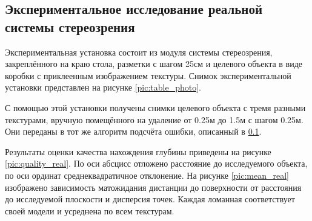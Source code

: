 \subsection{Экспериментальное исследование реальной системы стереозрения}

Экспериментальная установка состоит из модуля системы стереозрения, закреплённого на краю стола, 
разметки с шагом 25см и целевого объекта в виде коробки с приклеенным изображением текстуры. Снимок 
экспериментальной установки представлен на рисунке \ref{pic:table_photo}. 

С помощью этой установки получены снимки целевого объекта с тремя разными текстурами, вручную помещённого на
удаление от 0.25м до 1.5м с шагом 0.25м. Они переданы в тот же алгоритм подсчёта ошибки, описанный в \ref{}. 

Результаты оценки качества нахождения глубины приведены на рисунке \ref{pic:quality_real}. По оси абсцисс 
отложено расстояние до исследуемого объекта, по оси ординат среднеквадратичное отклонение. На рисунке \ref{pic:mean_real}
 изображено зависимость матожидания дистанции до поверхности от расстояния до исследуемой плоскости и дисперсия точек.
Каждая ломанная соответствует своей модели и усреднена по всем текстурам.








